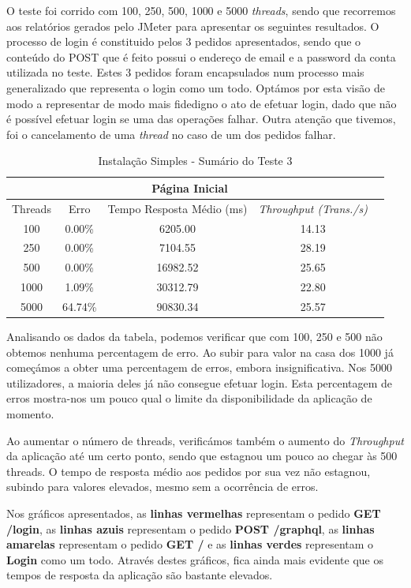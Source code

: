 O teste foi corrido com 100, 250, 500, 1000 e 5000 \textit{threads}, sendo que recorremos aos relatórios gerados pelo JMeter para apresentar os seguintes resultados.
O processo de login é constituido pelos 3 pedidos apresentados, sendo que o conteúdo do POST que é feito possui o endereço de email e a password da conta utilizada no teste. Estes 3 pedidos foram encapsulados num processo mais generalizado que representa o login como um todo. Optámos por esta visão de modo a representar de modo mais fidedigno o ato de efetuar login, dado que não é possível efetuar login se uma das operações falhar. Outra atenção que tivemos, foi o cancelamento de uma \textit{thread} no caso de um dos pedidos falhar.

\begin{table}[h!]
\centering
    \begin{tabular}{ |c|c|c|c|c|  }
        \hline
        \multicolumn{4}{|c|}{Página Inicial} \\
        \hline
         Threads & Erro & Tempo Resposta Médio (ms) & \textit{Throughput (Trans./s)}\\
        \hline
        100   & 0.00\%   & 6205.00  & 14.13\\
        250   & 0.00\%   & 7104.55  & 28.19\\
        500   & 0.00\%   & 16982.52 & 25.65\\
        1000  & 1.09\%   & 30312.79 & 22.80\\
        5000  & 64.74\%  & 90830.34 & 25.57\\
        \hline
    \end{tabular}
    \caption{Instalação Simples - Sumário do Teste 3}
    \label{table:1}
\end{table}

Analisando os dados da tabela, podemos verificar que com 100, 250 e 500 não obtemos nenhuma percentagem de erro. Ao subir para valor na casa dos 1000 já começámos a obter uma percentagem de erros, embora insignificativa. Nos 5000 utilizadores, a maioria deles já não consegue efetuar login. Esta percentagem de erros mostra-nos um pouco qual o limite da disponibilidade da aplicação de momento. 

Ao aumentar o número de threads, verificámos também o aumento do \textit{Throughput} da aplicação até um certo ponto, sendo que estagnou um pouco ao chegar às 500 threads. O tempo de resposta médio aos pedidos por sua vez não estagnou, subindo para valores elevados, mesmo sem a ocorrência de erros.

Nos gráficos apresentados, as \textbf{linhas vermelhas} representam o pedido \textbf{GET /login}, as \textbf{linhas azuis} representam o pedido \textbf{POST /graphql}, as \textbf{linhas amarelas} representam o pedido \textbf{GET /} e as \textbf{linhas verdes} representam o \textbf{Login} como um todo. Através destes gráficos, fica ainda mais evidente que os tempos de resposta da aplicação são bastante elevados.



